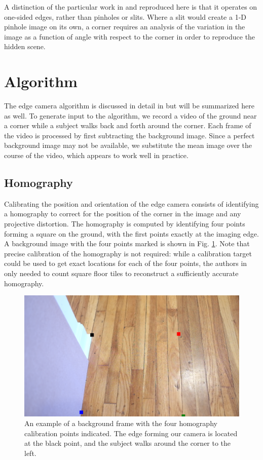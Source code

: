 \documentclass{article}
\begin{document}
A distinction of the particular work in \cite{bouman_turningcornerscameras2017} and reproduced here is that it operates on one-sided edges, rather than pinholes or slits. Where a slit would create a 1-D pinhole image on its own, a corner requires an analysis of the variation in the image as a function of angle with respect to the corner in order to reproduce the hidden scene. 

\section{Algorithm}

The edge camera algorithm is discussed in detail in \cite{bouman_turningcornerscameras2017} but will be summarized here as well. To generate input to the algorithm, we record a video of the ground near a corner while a subject walks back and forth around the corner. Each frame of the video is processed by first subtracting the background image. Since a perfect background image may not be available, we substitute the mean image over the course of the video, which appears to work well in practice. 

\subsection{Homography}

Calibrating the position and orientation of the edge camera consists of identifying a homography to correct for the position of the corner in the image and any projective distortion. The homography is computed by identifying four points forming a square on the ground, with the first points exactly at the imaging edge. A background image with the four points marked is shown in Fig. \ref{fig:background}. Note that precise calibration of the homography is not required: while a calibration target could be used to get exact locations for each of the four points, the authors in \cite{bouman_turningcornerscameras2017} only needed to count square floor tiles to reconstruct a sufficiently accurate homography. 

\begin{figure}[htbp]
	\includegraphics[width=\textwidth]{img/background.png}
	\caption{An example of a background frame with the four homography calibration points indicated. The edge forming our camera is located at the black point, and the subject walks around the corner to the left.}
	\label{fig:background}
\end{figure}
\end{document}
